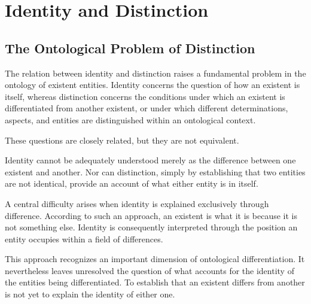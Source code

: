 %
%
%
%

\section{Identity and Distinction}
\label{sec:identity-and-distinction}

\subsection{The Ontological Problem of Distinction}

The relation between identity and distinction raises
a fundamental problem in the ontology of existent
entities. Identity concerns the question of how an
existent is itself, whereas distinction concerns the
conditions under which an existent is differentiated
from another existent, or under which different
determinations, aspects, and entities are distinguished
within an ontological context.

These questions are closely related, but they are
not equivalent.

Identity cannot be adequately understood merely
as the difference between one existent and another.
Nor can distinction, simply by establishing that
two entities are not identical, provide an account
of what either entity is in itself.

A central difficulty arises when identity is explained
exclusively through difference. According to such
an approach, an existent is what it is because it
is not something else. Identity is consequently
interpreted through the position an entity occupies
within a field of differences.

This approach recognizes an important dimension
of ontological differentiation. It nevertheless
leaves unresolved the question of what accounts
for the identity of the entities being differentiated.
To establish that an existent differs from another
is not yet to explain the identity of either one.

